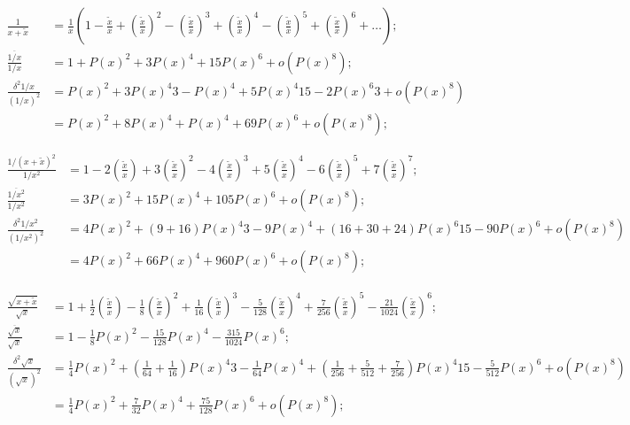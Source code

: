 \documentclass[twoside]{article}
\numberwithin{equation}{section}
\begin{document}
\begin{align*}
\frac{1}{x + \tilde{x}} &= \frac{1}{x} \left(1 - \frac{\tilde{x}}{x} + (\frac{\tilde{x}}{x})^2 - (\frac{\tilde{x}}{x})^3 + (\frac{\tilde{x}}{x})^4 
		 - (\frac{\tilde{x}}{x})^5 + (\frac{\tilde{x}}{x})^6 + \dots \right); \\
\frac{\overline{1/x}}{1/x} &= 1 + P(x)^2 + 3 P(x)^4 + 15 P(x)^6 + o(P(x)^8); \\
\frac{\delta^2 1/x}{(1/x)^2} &= P(x)^2 + 3 P(x)^4 3 - P(x)^4  + 5 P(x)^4 15 - 2 P(x)^6 3 + o(P(x)^8) \\
	&= P(x)^2 + 8 P(x)^4 + P(x)^4 + 69 P(x)^6 + o(P(x)^8) ;
\end{align*}

\begin{align*}
\frac{1/(x + \tilde{x})^2}{1/x^2} &= 1 - 2 (\frac{\tilde{x}}{x}) + 3 (\frac{\tilde{x}}{x})^2 -4  (\frac{\tilde{x}}{x})^3 
		+5 (\frac{\tilde{x}}{x})^4 - 6 (\frac{\tilde{x}}{x})^5 + 7 (\frac{\tilde{x}}{x})^7; \\
\frac{\overline{1/x^2}}{1/x^2} &= 3 P(x)^2 + 15 P(x)^4 + 105 P(x)^6 + o(P(x)^8); \\
\frac{\delta^2 1/x^2}{(1/x^2)^2} &= 4 P(x)^2 + (9 + 16) P(x)^4 3 - 9 P(x)^4 + (16 + 30+ 24) P(x)^6 15 - 90 P(x)^6 + o(P(x)^8)  \\
	&= 4 P(x)^2 + 66 P(x)^4 + 960 P(x)^6 + o(P(x)^8);
\end{align*}

\begin{align*}
\frac{\sqrt{x + \tilde{x}}}{\sqrt{x}} &= 1 + \frac{1}{2} (\frac{\tilde{x}}{x}) - \frac{1}{8} (\frac{\tilde{x}}{x})^2 + \frac{1}{16} (\frac{\tilde{x}}{x})^3 
		- \frac{5}{128} (\frac{\tilde{x}}{x})^4 + \frac{7}{256} (\frac{\tilde{x}}{x})^5 - \frac{21}{1024} (\frac{\tilde{x}}{x})^6; \\
\frac{\overline{\sqrt{x}}}{\sqrt{x}} &= 1 - \frac{1}{8} P(x)^2 - \frac{15}{128} P(x)^4 - \frac{315}{1024} P(x)^6; \\
\frac{\delta^2 \sqrt{x}}{(\sqrt{x})^2} &= \frac{1}{4} P(x)^2 + (\frac{1}{64} + \frac{1}{16}) P(x)^4 3 - \frac{1}{64} P(x)^4  
		+ (\frac{1}{256} + \frac{5}{512} + \frac{7}{256}) P(x)^4 15 - \frac{5}{512} P(x)^6 + o(P(x)^8) \\
	&= \frac{1}{4} P(x)^2 + \frac{7}{32} P(x)^4 + \frac{75}{128} P(x)^6 + o(P(x)^8) ;
\end{align*}

\fi
\end{document}
